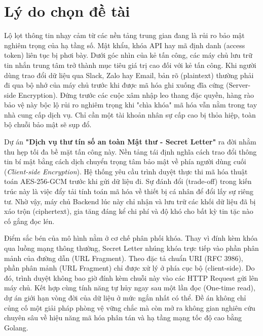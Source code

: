 \section{Lý do chọn đề tài}

Lộ lọt thông tin nhạy cảm từ các nền tảng trung gian đang là rủi ro bảo mật nghiêm trọng của hạ tầng số. Mật khẩu, khóa API hay mã định danh (access token) liên tục bị phơi bày. Dưới góc nhìn của kẻ tấn công, các máy chủ lưu trữ tin nhắn trung tâm trở thành mục tiêu giá trị cao đối với kẻ tấn công. Khi người dùng trao đổi dữ liệu qua Slack, Zalo hay Email, bản rõ (plaintext) thường phải đi qua bộ nhớ của máy chủ trước khi được mã hóa ghi xuống đĩa cứng (Server-side Encryption). Đứng trước các cuộc xâm nhập leo thang đặc quyền, hàng rào bảo vệ này bộc lộ rủi ro nghiêm trọng khi "chìa khóa" mã hóa vẫn nằm trong tay nhà cung cấp dịch vụ. Chỉ cần một tài khoản nhân sự cấp cao bị thỏa hiệp, toàn bộ chuỗi bảo mật sẽ sụp đổ.

Dự án \textbf{"Dịch vụ thư tín số an toàn Mật thư - Secret Letter"} ra đời nhằm thu hẹp tối đa bề mặt tấn công này. Nền tảng tái định nghĩa cách trao đổi thông tin bí mật bằng cách dịch chuyển trọng tâm bảo mật về phía người dùng cuối (\textit{Client-side Encryption}). Hệ thống yêu cầu trình duyệt thực thi mã hóa thuật toán AES-256-GCM trước khi gửi dữ liệu đi. Sự đánh đổi (trade-off) trong kiến trúc này là việc đẩy tải tính toán mã hóa về thiết bị cá nhân để đổi lấy sự riêng tư. Nhờ vậy, máy chủ Backend lúc này chỉ nhận và lưu trữ các khối dữ liệu đã bị xáo trộn (ciphertext), gia tăng đáng kể chi phí và độ khó cho bất kỳ tin tặc nào cố gắng đọc lén.

Điểm sắc bén của mô hình nằm ở cơ chế phân phối khóa. Thay vì đính kèm khóa qua luồng mạng thông thường, Secret Letter nhúng khóa trực tiếp vào phần phân mảnh của đường dẫn (URL Fragment). Theo đặc tả chuẩn URI (RFC 3986), phần phân mảnh (URL Fragment) chỉ được xử lý ở phía cục bộ (client-side). Do đó, trình duyệt không bao giờ đính kèm chuỗi này vào các HTTP Request gửi lên máy chủ. Kết hợp cùng tính năng tự hủy ngay sau một lần đọc (One-time read), dự án giới hạn vòng đời của dữ liệu ở mức ngắn nhất có thể. Đề án không chỉ củng cố một giải pháp phòng vệ vững chắc mà còn mở ra không gian nghiên cứu chuyên sâu về hiệu năng mã hóa phân tán và hạ tầng mạng tốc độ cao bằng Golang.